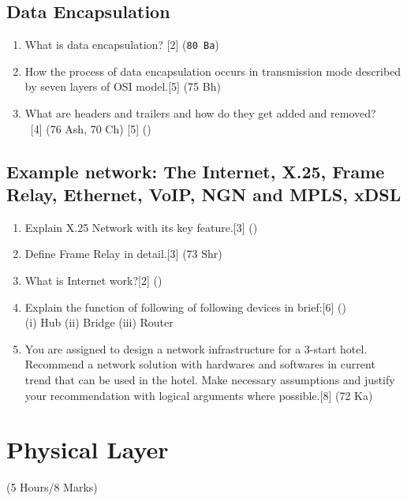 \documentclass[12pt]{article}
\newcommand{\enter}{\\\textcolor{white}{1}}
\begin{document}
		\subsection{Data Encapsulation}
		\begin{enumerate}[noitemsep, topsep = 0pt]
			\item What is data encapsulation? \hfill [2] (\texttt{80 Ba})
			
			\item How the process of data encapsulation occurs in transmission mode described by seven layers of OSI model.\hfill[5] (75 Bh)

			\item What are headers and trailers and how do they get added and removed?
		\enter\hfill[4] (76 Ash, 70 Ch) [5] () 
		\end{enumerate}

		\subsection{Example network: The Internet, X.25, Frame Relay, Ethernet, VoIP, NGN and MPLS, xDSL}
		\begin{enumerate}[noitemsep, topsep = 0pt]
		\item Explain X.25 Network with its key feature.\hfill[3] ()
		\item Define Frame Relay in detail.\hfill[3] (73 Shr)
		\item What is Internet work?\hfill[2] ()
		\item Explain the function of following of following devices in brief:\hfill[6] ()\\
		(i) Hub (ii) Bridge (iii) Router
		\item You are assigned to design a network infrastructure for a 3-start hotel. Recommend a network solution with hardwares and softwares in current trend that can be used in the hotel. Make necessary assumptions and justify your recommendation with logical arguments where possible.\hfill[8] (72 Ka)
		\end{enumerate}

	\pagebreak

\section{Physical Layer}
	\begin{center}(5 Hours/8 Marks)\end{center}
\end{document}
